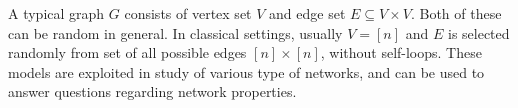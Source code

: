 \documentclass[a4paper,10pt,english]{article}
\begin{document}
\begin{exmp} A typical graph $G$ consists of vertex set $V$ and edge set $E \subseteq V \times V$. Both of these can be random in general. In classical settings, usually $V = [n]$ and $E$ is selected randomly from set of all possible edges $[n] \times [n]$, without self-loops. These models are exploited in study of various type of networks, and can be used to answer questions regarding network properties.
\end{exmp}
\end{document}

